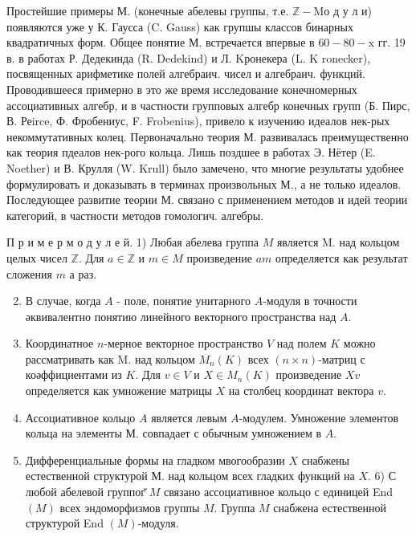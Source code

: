 \documentclass[10pt]{article}
\begin{document}
Простейшие примеры М. (конечные абелевы группы, т.е. $\mathbb{Z}-\mathrm{M} о$ д у л и) появляются уже у К. Гаусса (C. Gauss) как групшы классов бинарных квадратичных форм. Общее понятие М. встречается впервые в $60-80-\mathrm{x}$ гг. 19 в. в работах Р. Дедекинда (R. Dedekind) и Л. Kронекера (L. K ronecker), посвященных арифметике полей алгебраич. чисел и алгебраич. функций. Проводившееся примерно в это же время исследование конечномерных ассоциативных алгебр, и в частности групповых алгебр конечных групп (Б. Пирс, В. Реirce, Ф. Фробениус, F. Frobenius), привело к изучению идеалов нек-рых некоммутативных колец. Первоначально теория М. развивалась преимущественно как теория пдеалов нек-рого кольца. Лишь поздшее в работах Э. Нётер (E. Noether) и В. Крулля (W. Krull) было замечено, что многие результаты удобнее формулировать и доказывать в терминах произвольных М., а не только идеалов. Последующее развитие теории М. связано с применением методов и идей теории категорий, в частности методов гомологич. алгебры.



П р и м е р м о д у л е й. 1) Любая абелева группа $M$ является $\mathrm{M}$. над кольцом целых чисел $\mathbb{Z}$. Для $a \in \mathbb{Z}$ и $m \in M$ произведение $a m$ определяется как результат сложения $m$ а раз.



\begin{enumerate}

  \setcounter{enumi}{1}

  \item В случае, когда $A$ - поле, понятие унитарного $A$-модуля в точности әквивалентно понятию линейного векторного пространства над $A$.



  \item Координатное $n$-мерное векторное пространство $V$ над полем $K$ можно рассматривать как M. над кольцом $M_{n}(K)$ всех $(n \times n)$-матриц с коәффициентами из $K$. Для $v \in V$ и $X \in M_{n}(K)$ произведение $X v$ определяется как умножение матрицы $X$ на столбец координат вектора $v$.



  \item Ассоциативное кольцо $A$ является левым $A$-модулем. Умножение элементов кольца на элементы М. совпадает с обычным умножением в $A$.



  \item Дифференциальные формы на гладком мвогообразии $X$ снабжены естественной структурой М. над кольцом всех гладких функций на $X$. 6) С любой абелевой группог̆ $M$ связано ассоциативное кольцо с единицей End $(M)$ всех эндоморфизмов группы $M$. Группа $M$ снабжена естественной структурой End $(M)$-модуля.



\end{enumerate}
\end{document}
